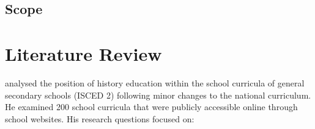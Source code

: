 \documentclass[]{interact}
\theoremstyle{plain}%
\theoremstyle{definition}
\theoremstyle{remark}
\begin{document}

\subsection{Scope}






\section{Literature Review}






\cite{Jirecek2023Tricet, Jirecek2023Promeny} analysed the position of history education within the school curricula of general secondary schools (ISCED 2) following minor changes to the national curriculum. He examined 200 school curricula that were publicly accessible online through school websites. His research questions focused on: 
\end{document}
